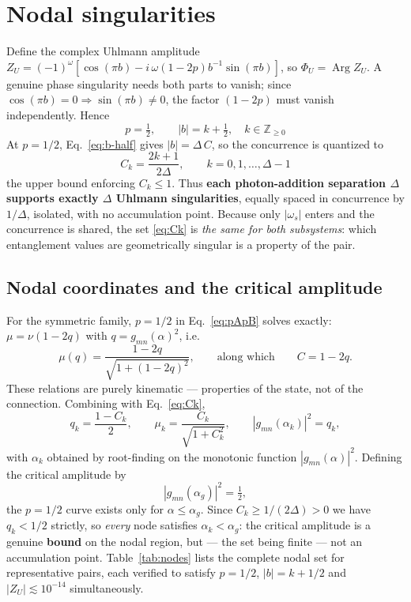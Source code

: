 \documentclass[11pt]{article}
\newcommand{\Arg}{\operatorname{Arg}}
\begin{document}
\section{Nodal singularities}
\label{sec:nodal}

Define the complex Uhlmann amplitude
$Z_U=(-1)^\omega[\cos(\pi b)-i\,\omega(1-2p)b^{-1}\sin(\pi b)]$, so
$\Phi_U=\Arg Z_U$. A genuine phase singularity needs both parts to vanish;
since $\cos(\pi b)=0\Rightarrow\sin(\pi b)\neq0$, the factor $(1-2p)$ must
vanish independently. Hence
\begin{equation}
\boxed{\;p=\tfrac12,\qquad |b|=k+\tfrac12,\quad k\in\mathbb Z_{\ge0}\;}
\label{eq:nodal-cond}
\end{equation}
At $p=1/2$, Eq.~\eqref{eq:b-half} gives $|b|=\Delta\,C$, so the concurrence is
quantized to
\begin{equation}
\boxed{\;C_k=\frac{2k+1}{2\Delta},\qquad k=0,1,\dots,\Delta-1\;}
\label{eq:Ck}
\end{equation}
the upper bound enforcing $C_k\le1$. Thus \textbf{each photon-addition
separation $\Delta$ supports exactly $\Delta$ Uhlmann singularities}, equally
spaced in concurrence by $1/\Delta$, isolated, with no accumulation point.
Because only $|\omega_s|$ enters and the concurrence is shared, the set
\eqref{eq:Ck} is \emph{the same for both subsystems}: which entanglement values
are geometrically singular is a property of the pair.

\subsection{Nodal coordinates and the critical amplitude}

For the symmetric family, $p=1/2$ in Eq.~\eqref{eq:pApB} solves exactly:
$\mu=\nu(1-2q)$ with $q=g_{mn}(\alpha)^2$, i.e.
\begin{equation}
\mu(q)=\frac{1-2q}{\sqrt{1+(1-2q)^2}},\qquad\text{along which}\qquad C=1-2q .
\label{eq:mu-of-q}
\end{equation}
These relations are purely kinematic --- properties of the state, not of the
connection. Combining with Eq.~\eqref{eq:Ck},
\begin{equation}
q_k=\frac{1-C_k}{2},\qquad
\mu_k=\frac{C_k}{\sqrt{1+C_k^2}},\qquad
|g_{mn}(\alpha_k)|^2=q_k ,
\label{eq:nodal-coords}
\end{equation}
with $\alpha_k$ obtained by root-finding on the monotonic function
$|g_{mn}(\alpha)|^2$. Defining the critical amplitude by
\begin{equation}
|g_{mn}(\alpha_g)|^2=\tfrac12 ,
\label{eq:alphag}
\end{equation}
the $p=1/2$ curve exists only for $\alpha\le\alpha_g$. Since
$C_k\ge1/(2\Delta)>0$ we have $q_k<1/2$ strictly, so \emph{every} node
satisfies $\alpha_k<\alpha_g$: the critical amplitude is a genuine
\textbf{bound} on the nodal region, but --- the set being finite --- not an
accumulation point. Table~\ref{tab:nodes} lists the complete nodal set for
representative pairs, each verified to satisfy $p=1/2$, $|b|=k+1/2$ and
$|Z_U|\lesssim10^{-14}$ simultaneously.
\end{document}
